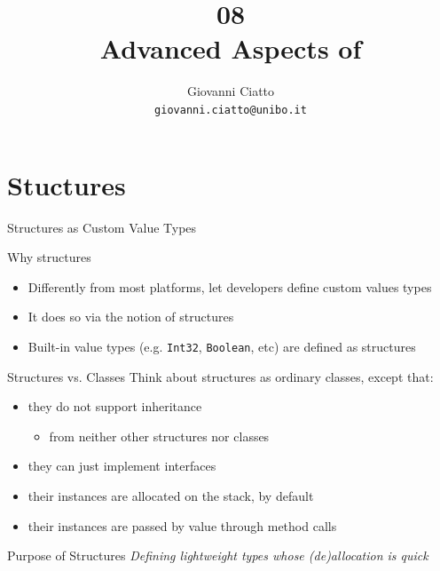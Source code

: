 \documentclass[presentation]{beamer}
\title[\lecturecode{08}]{08 \\ Advanced Aspects of \dotnet}
\author[Giovanni Ciatto]{Giovanni Ciatto\\\texttt{giovanni.ciatto@unibo.it}}
\begin{document}
\frame[label=coverpage]{\titlepage}

\section{Stuctures}

\begin{frame}[allowframebreaks]{Structures as Custom Value Types}
  \begin{block}{Why structures}
    \begin{itemize}
      \item Differently from most platforms, \dotnet let developers define \alert{custom} values types
      \item It does so via the notion of \alert{structures}
      \item Built-in value types (e.g. \texttt{Int32}, \texttt{Boolean}, etc) are defined as structures
    \end{itemize}
  \end{block}

  \begin{block}{Structures vs. Classes}
    Think about structures as ordinary classes, except that:
    \begin{itemize}
      \item they \alert{do not} support \alert{inheritance}
      \begin{itemize}
        \item from neither other structures nor classes
      \end{itemize}

      \item they \alert{can} just implement \alert{interfaces}
      \item their instances are allocated \alert{on the stack}, by default
      \item their instances are passed \alert{by value} through method calls
    \end{itemize}
  \end{block}

  \begin{alertblock}{Purpose of Structures}\centering\itshape
    Defining \alert{lightweight} types whose (de)allocation is \alert{quick}
  \end{alertblock}


\end{frame}
\end{document}
